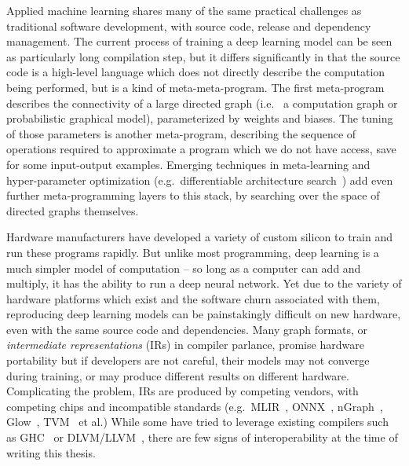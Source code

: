 \documentclass[12pt,initial,twoside,maitrise]{dms}
\numberwithin{equation}{section}
\numberwithin{table}{chapter}
\numberwithin{figure}{chapter}
\begin{document}
Applied machine learning shares many of the same practical challenges as traditional software development, with source code, release and dependency management. The current process of training a deep learning model can be seen as particularly long compilation step, but it differs significantly in that the source code is a high-level language which does not directly describe the computation being performed, but is a kind of meta-meta-program. The first meta-program describes the connectivity of a large directed graph (i.e.~ a computation graph or probabilistic graphical model), parameterized by weights and biases. The tuning of those parameters is another meta-program, describing the sequence of operations required to approximate a program which we do not have access, save for some input-output examples. Emerging techniques in meta-learning and hyper-parameter optimization (e.g.~differentiable architecture search~\citep{liu2018darts}) add even further meta-programming layers to this stack, by searching over the space of directed graphs themselves.

Hardware manufacturers have developed a variety of custom silicon to train and run these programs rapidly. But unlike most programming, deep learning is a much simpler model of computation -- so long as a computer can add and multiply, it has the ability to run a deep neural network. Yet due to the variety of hardware platforms which exist and the software churn associated with them, reproducing deep learning models can be painstakingly difficult on new hardware, even with the same source code and dependencies. Many graph formats, or \textit{intermediate representations} (IRs) in compiler parlance, promise hardware portability but if developers are not careful, their models may not converge during training, or may produce different results on different hardware. Complicating the problem, IRs are produced by competing vendors, with competing chips and incompatible standards (e.g.~MLIR~\citep{mlir}, ONNX~\citep{bai2019}, nGraph~\citep{cyphers2018intel}, Glow~\citep{rotem2018glow}, TVM~\citep{tvm2018} et al.) While some have tried to leverage existing compilers such as GHC~\citep{elliott2018simple} or DLVM/LLVM~\citep{wei2017dlvm}, there are few signs of interoperability at the time of writing this thesis.
\end{document}
